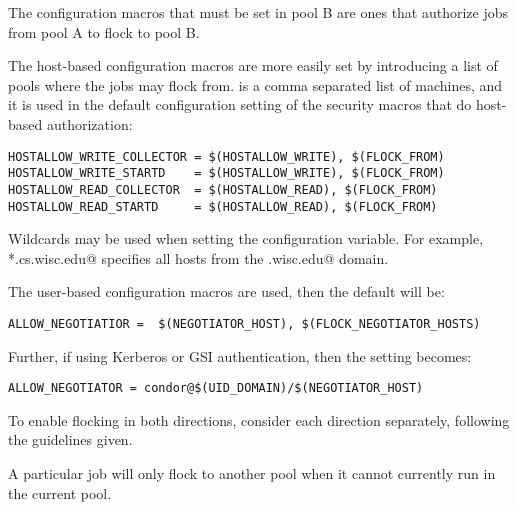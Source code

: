 The configuration macros that must be set in 
pool B are ones that authorize jobs from pool A
to flock to pool B.

The host-based configuration macros are more easily
set by introducing a list of pools where the jobs may flock from. 
 is a comma separated list of machines,
and  it is used in the default configuration setting
of the security macros that do host-based authorization:
\footnotesize
\begin{verbatim}
HOSTALLOW_WRITE_COLLECTOR = $(HOSTALLOW_WRITE), $(FLOCK_FROM)
HOSTALLOW_WRITE_STARTD    = $(HOSTALLOW_WRITE), $(FLOCK_FROM)
HOSTALLOW_READ_COLLECTOR  = $(HOSTALLOW_READ), $(FLOCK_FROM)
HOSTALLOW_READ_STARTD     = $(HOSTALLOW_READ), $(FLOCK_FROM)
\end{verbatim}
\normalsize

Wildcards may be used when setting the 
configuration variable.
For example, \verb@*.cs.wisc.edu@ specifies all hosts
from the \verb@cs.wisc.edu@ domain. 

The user-based configuration macros are used, then the default
will be:
\footnotesize
\begin{verbatim}
ALLOW_NEGOTIATIOR =  $(NEGOTIATOR_HOST), $(FLOCK_NEGOTIATOR_HOSTS)
\end{verbatim}
\normalsize

Further, if using Kerberos or GSI authentication, then the setting
becomes:
\footnotesize
\begin{verbatim}
ALLOW_NEGOTIATOR = condor@$(UID_DOMAIN)/$(NEGOTIATOR_HOST)
\end{verbatim}
\normalsize

To enable flocking in both directions, consider each direction
separately, following the guidelines given.

A particular job will only flock to another pool
when it cannot currently run in the current pool.


